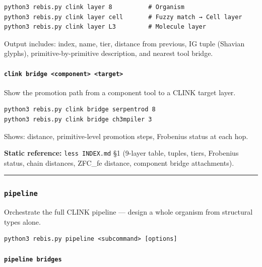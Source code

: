 \begin{verbatim}
python3 rebis.py clink layer 8          # Organism
python3 rebis.py clink layer cell       # Fuzzy match → Cell layer
python3 rebis.py clink layer L3         # Molecule layer
\end{verbatim}

Output includes: index, name, tier, distance from previous, IG tuple
(Shavian glyphs), primitive-by-primitive description, and nearest tool
bridge.

\hypertarget{clink-bridge-component-target}{%
\paragraph{\texorpdfstring{\texttt{clink\ bridge\ \textless{}component\textgreater{}\ \textless{}target\textgreater{}}}{clink bridge \textless component\textgreater{} \textless target\textgreater{}}}\label{clink-bridge-component-target}}

Show the promotion path from a component tool to a CLINK target layer.

\begin{verbatim}
python3 rebis.py clink bridge serpentrod 8
python3 rebis.py clink bridge ch3mpiler 3
\end{verbatim}

Shows: distance, primitive-level promotion steps, Frobenius status at
each hop.

\textbf{Static reference:} \texttt{less\ INDEX.md} §1 (9-layer table,
tuples, tiers, Frobenius status, chain distances, ZFC\_fe distance,
component bridge attachments).

\begin{center}\rule{0.5\linewidth}{0.5pt}\end{center}

\hypertarget{pipeline}{%
\subsubsection{\texorpdfstring{\texttt{pipeline}}{pipeline}}\label{pipeline}}

Orchestrate the full CLINK pipeline --- design a whole organism from
structural types alone.

\begin{verbatim}
python3 rebis.py pipeline <subcommand> [options]
\end{verbatim}

\hypertarget{pipeline-bridges}{%
\paragraph{\texorpdfstring{\texttt{pipeline\ bridges}}{pipeline bridges}}\label{pipeline-bridges}}

